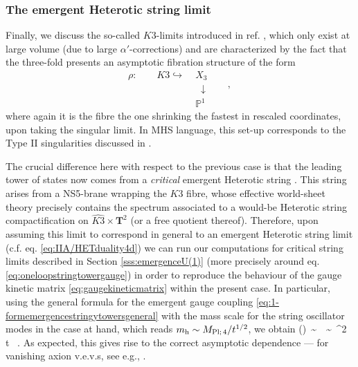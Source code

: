 \subsubsection*{The emergent Heterotic string limit}
\label{sss:IIA-heteroticlimit}		
Finally, we discuss the so-called $K3$-limits introduced in ref. \cite{Lee:2019wij}, which only exist at large volume (due to large $\alpha'$-corrections) and are characterized by the fact that the three-fold presents an asymptotic fibration structure of the form
%
\begin{equation}\label{eq:K3fibration}
			\begin{aligned}
				\rho: \qquad K3 \hookrightarrow &\;X_{3} \\
				&\;\; \downarrow \qquad , \\ &\;\mathbb{P}^1
			\end{aligned}
\end{equation}
%
where again it is the fibre the one shrinking the fastest in rescaled coordinates, upon taking the singular limit. In MHS language, this set-up corresponds to the Type II singularities discussed in \cite{Corvilain:2018lgw}.
		
The crucial difference here with respect to the previous case is that the leading tower of states now comes from a \emph{critical} emergent Heterotic string \cite{Lee:2019wij}. This string arises from a NS5-brane wrapping the $K3$ fibre, whose effective world-sheet theory precisely contains the spectrum associated to a would-be Heterotic string compactification on $\widehat{K3} \times \mathbf{T}^2$ (or a free quotient thereof)\cite{Harvey:1995rn}. Therefore, upon assuming this limit to correspond in general to an emergent Heterotic string limit (c.f. eq. \eqref{eq:IIA/HETduality4d}) we can run our computations for critical string limits described in Section \ref{sss:emergenceU(1)} (more precisely around eq. \eqref{eq:oneloopstringtowergauge}) in order to reproduce the behaviour of the gauge kinetic matrix \eqref{eq:gaugekineticmatrix} within the present case. In particular, using the general formula for the emergent gauge coupling \eqref{eq:1-formemergencestringytowersgeneral} with the mass scale for the string oscillator modes in the case at hand, which reads $m_{\rm h}\sim M_{\text{Pl;}\, 4}/t^{1/2}$, we obtain
%
\beq
	\delta \left(\right)\, \sim\,  \, \sim \, \Mpf^2\, t \, .
\eeq 
%
As expected, this gives rise to the correct asymptotic dependence --- for vanishing axion v.e.v.s, see e.g., \cite{Grimm:2018ohb}. %

